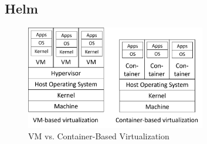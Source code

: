 \subsection*{Helm}





\begin{figure}[tb]
	\centering
	\includegraphics[width=0.7\textwidth]{figures/vm_container_virtualization.png}
	\caption{VM vs. Container-Based Virtualization \cite{CM-W-CON}}
	\label{fig:vm_container_virtualization}
\end{figure}

